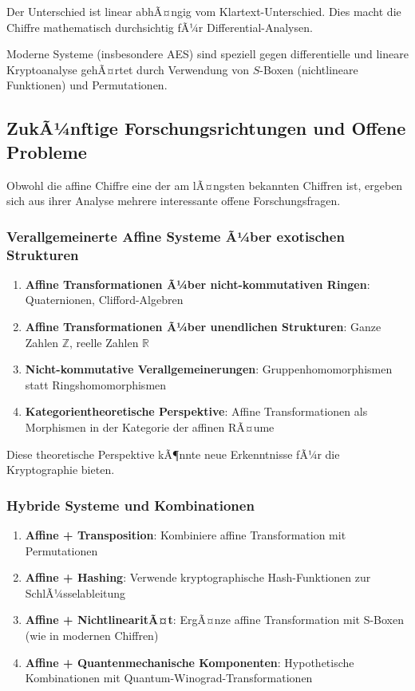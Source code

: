 ﻿\documentclass[12pt,a4paper]{article}
\begin{document}
	Der Unterschied ist linear abhÃ¤ngig vom Klartext-Unterschied. Dies macht die Chiffre mathematisch durchsichtig fÃ¼r Differential-Analysen.
	
	Moderne Systeme (insbesondere AES) sind speziell gegen differentielle und lineare Kryptoanalyse gehÃ¤rtet durch Verwendung von $S$-Boxen (nichtlineare Funktionen) und Permutationen.
	
	
	\subsection{ZukÃ¼nftige Forschungsrichtungen und Offene Probleme}
	
	Obwohl die affine Chiffre eine der am lÃ¤ngsten bekannten Chiffren ist, ergeben sich aus ihrer Analyse mehrere interessante offene Forschungsfragen.
	
	\subsubsection{Verallgemeinerte Affine Systeme Ã¼ber exotischen Strukturen}
	
	\begin{enumerate}
		\item \textbf{Affine Transformationen Ã¼ber nicht-kommutativen Ringen}: Quaternionen, Clifford-Algebren
		\item \textbf{Affine Transformationen Ã¼ber unendlichen Strukturen}: Ganze Zahlen $\mathbb{Z}$, reelle Zahlen $\mathbb{R}$
		\item \textbf{Nicht-kommutative Verallgemeinerungen}: Gruppenhomomorphismen statt Ringshomomorphismen
		\item \textbf{Kategorientheoretische Perspektive}: Affine Transformationen als Morphismen in der Kategorie der affinen RÃ¤ume
	\end{enumerate}
	
	Diese theoretische Perspektive kÃ¶nnte neue Erkenntnisse fÃ¼r die Kryptographie bieten.
	
	\subsubsection{Hybride Systeme und Kombinationen}
	
	\begin{enumerate}
		\item \textbf{Affine + Transposition}: Kombiniere affine Transformation mit Permutationen
		\item \textbf{Affine + Hashing}: Verwende kryptographische Hash-Funktionen zur SchlÃ¼sselablei\-tung
		\item \textbf{Affine + NichtlinearitÃ¤t}: ErgÃ¤nze affine Transformation mit S-Boxen (wie in modernen Chiffren)
		\item \textbf{Affine + Quantenmechanische Komponenten}: Hypothetische Kombinationen mit Quantum-Winograd-Transformationen
	\end{enumerate}
	
\end{document}
